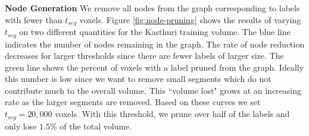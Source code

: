 \noindent
\textbf{Node Generation}
We remove all nodes from the graph corresponding to labels with fewer than $t_{seg}$ voxels.
Figure \ref{fig:node-pruning} shows the results of varying $t_{seg}$ on two different quantities for the Kasthuri training volume. 
The blue line indicates the number of nodes remaining in the graph.
The rate of node reduction decreases for larger thresholds since there are fewer labels of larger size. 
The green line shows the percent of voxels with a label pruned from the graph.
Ideally this number is low since we want to remove small segments which do not contribute much to the overall volume.
This ``volume lost" grows at an increasing rate as the larger segments are removed. 
Based on these curves we set $t_{seg} = 20,000$ voxels.
With this threshold, we prune over half of the labels and only lose $1.5\%$ of the total volume.
